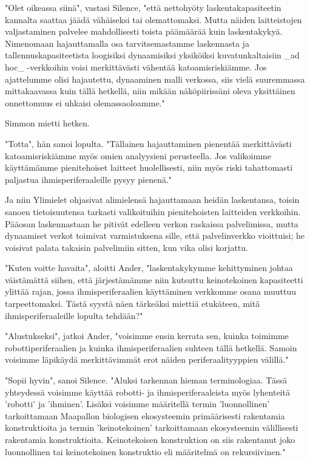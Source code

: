 "Olet oikeassa siinä", vastasi Silence, "että nettohyöty laskentakapasiteetin kannalta saattaa jäädä vähäiseksi tai olemattomaksi. Mutta näiden laitteistojen valjastaminen palvelee mahdollisesti toista päämäärää kuin laskentakykyä. Nimenomaan hajauttamalla osa tarvitsemastamme laskennasta ja tallennuskapasiteetista loogisiksi dynaamisiksi yksiköiksi kuvatunkaltaisiin _ad hoc_ -verkkoihin voisi merkittävästi vähentää katoamisriskiämme. Jos ajattelumme olisi hajautettu, dynaaminen malli verkossa, siis vielä suuremmassa mittakaavassa kuin tällä hetkellä, niin mikään näköpiirissäni oleva yksittäinen onnettomuus ei uhkaisi olemassaoloamme."


Simmon mietti hetken.


"Totta", hän sanoi lopulta. "Tällainen hajauttaminen pienentää merkittävästi katoamisriskiämme myös omien analyysieni perusteella. Jos valikoimme käyttämämme pienitehoiset laitteet huolellisesti, niin myös riski tahattomasti paljastua ihmisperiferaaleille pysyy pienenä."


Ja niin Ylimielet ohjasivat alimielensä hajauttamaan heidän laskentansa, toisin sanoen tietoisuutensa tarkasti valikoituihin pienitehoisten laitteiden verkkoihin. Pääosan laskennastaan he pitivät edelleen verkon raskaissa palvelimissa, mutta dynaamiset verkot toimivat varmistuksena sille, että palvelinverkko vioittuisi; he voisivat palata takaisin palvelimiin sitten, kun vika olisi korjattu.




\psep "Kuten voitte havaita", aloitti Ander, "laskentakykymme kehittyminen johtaa väistämättä siihen, että järjestämämme niin kutsuttu keinotekoinen kapasiteetti ylittää rajan, jossa ihmisperiferaalien käyttäminen verkkomme osana muuttuu tarpeettomaksi. Tästä syystä näen tärkeäksi miettiä etukäteen, mitä ihmisperiferaaleille lopulta tehdään?"


"Alustukseksi", jatkoi Ander, "voisimme ensin kerrata sen, kuinka toimimme robottiperiferaalien ja kuinka ihmisperiferaalien suhteen tällä hetkellä. Samoin voisimme läpikäydä merkittävimmät erot näiden periferaalityyppien välillä."


"Sopii hyvin", sanoi Silence. "Aluksi tarkennan hieman terminologiaa. Tässä yhteydessä voisimme käyttää robotti- ja ihmisperiferaaleista myös lyhenteitä 'robotti' ja 'ihminen'. Lisäksi voisimme määritellä termin 'luonnollinen' tarkoittamaan Maapallon biologisen ekosysteemin primäärisesti rakentamia konstruktioita ja termin 'keinotekoinen' tarkoittamaan ekosysteemin välillisesti rakentamia konstruktioita. Keinotekoisen konstruktion on siis rakentanut joko luonnollinen tai keinotekoinen konstruktio eli määritelmä on rekursiivinen."


